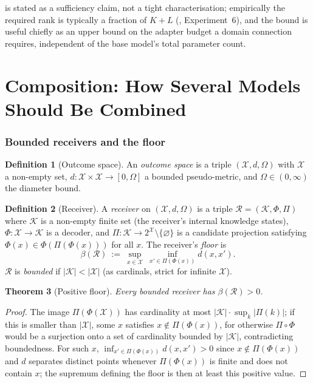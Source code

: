 \documentclass[11pt,twocolumn,a4paper]{article}
\theoremstyle{rdm}
\newtheorem{theorem}{Theorem}[section]
\theoremstyle{definition}
\newtheorem{definition}[theorem]{Definition}
\theoremstyle{remark}
\newcommand{\flo}{\beta}
\newcommand{\Om}{\Omega}
\newcommand{\Rec}{\mathcal{R}}
\newcommand{\Cands}{\mathcal{X}}
\newcommand{\Know}{\mathcal{K}}
\begin{document}
 is stated as a sufficiency claim, not a tight
characterisation; empirically the required rank is typically a fraction of
$K+L$ (, Experiment~6), and the bound is useful chiefly
as an upper bound on the adapter budget a domain connection requires,
independent of the base model's total parameter count.



\part{Composition: How Several Models Should Be Combined}
\label{part:compose}

\section{Bounded receivers and the floor}
\label{sec:receivers}

\begin{definition}[Outcome space]
\label{def:outcome}
An \emph{outcome space} is a triple $(\Cands,d,\Om)$ with $\Cands$ a
non-empty set, $d:\Cands\times\Cands\to[0,\Om]$ a bounded pseudo-metric, and
$\Om\in(0,\infty)$ the diameter bound.
\end{definition}

\begin{definition}[Receiver]
\label{def:receiver}
A \emph{receiver} on $(\Cands,d,\Om)$ is a triple
$\Rec=(\Know,\Phi,\Pi)$ where $\Know$ is a non-empty finite set (the
receiver's internal knowledge states), $\Phi:\Cands\to\Know$ is a decoder,
and $\Pi:\Know\to 2^{\Cands}\setminus\{\varnothing\}$ is a candidate
projection satisfying $\Phi(x)\in\Phi(\Pi(\Phi(x)))$ for all $x$. The
receiver's \emph{floor} is
\[
\flo(\Rec)\ :=\ \sup_{x\in\Cands}\ \inf_{x'\in\Pi(\Phi(x))} d(x,x').
\]
$\Rec$ is \emph{bounded} if $|\Know| < |\Cands|$ (as cardinals, strict for
infinite $\Cands$).
\end{definition}

\begin{theorem}[Positive floor]
\label{thm:pos-floor}
Every bounded receiver has $\flo(\Rec) > 0$.
\end{theorem}

\begin{proof}
The image $\Pi(\Phi(\Cands))$ has cardinality at most $|\Know|\cdot
\sup_k|\Pi(k)|$; if this is smaller than $|\Cands|$, some $x$ satisfies
$x \notin \Pi(\Phi(x))$, for otherwise $\Pi\circ\Phi$ would be a surjection
onto a set of cardinality bounded by $|\Know|$, contradicting
boundedness. For such $x$, $\inf_{x'\in\Pi(\Phi(x))}d(x,x')>0$ since
$x\notin\Pi(\Phi(x))$ and $d$ separates distinct points whenever $\Pi(\Phi(x))$
is finite and does not contain $x$; the supremum defining the floor is then
at least this positive value.
\end{proof}
\end{document}
